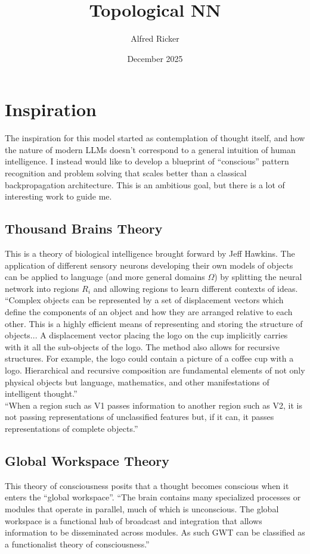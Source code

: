 \documentclass[twocolumn, 10pt]{article}
\title{Topological NN}
\author{Alfred Ricker}
\date{December 2025}
\begin{document}
\setlength{\parindent}{0pt}

\maketitle
\section{Inspiration}
The inspiration for this model started as contemplation of thought itself, and how the nature of modern LLMs doesn't correspond to a general intuition of human intelligence. I instead would like to develop a blueprint of ``conscious'' pattern recognition and problem solving that scales better than a classical backpropagation architecture. This is an ambitious goal, but there is a lot of interesting work to guide me.

\subsection{Thousand Brains Theory}
This is a theory of biological intelligence brought forward by Jeff Hawkins. The application of different sensory neurons developing their own models of objects can be applied to language (and more general domains $\Omega$) by splitting the neural network into regions $R_i$ and allowing regions to learn different contexts of ideas. \\

``Complex objects can be represented by a set of displacement vectors which define the components of an object and how they are arranged relative to each other. This is a highly efficient means of representing and storing the structure of objects... A displacement vector placing the logo on the cup implicitly carries with it all the sub-objects of the logo. The method also allows for recursive structures. For example, the logo could contain a picture of a coffee cup with a logo. Hierarchical and recursive composition are fundamental elements of not only physical objects but language, mathematics, and other manifestations of intelligent thought.'' \\ 

``When a region such as V1 passes information to another region such as V2, it is not passing representations of unclassified features but, if it can, it passes representations of complete objects.''

\subsection{Global Workspace Theory}
This theory of consciousness posits that a thought becomes conscious when it enters the ``global workspace''. ``The brain contains many specialized processes or modules that operate in parallel, much of which is unconscious. The global workspace is a functional hub of broadcast and integration that allows information to be disseminated across modules. As such GWT can be classified as a functionalist theory of consciousness.'' \\
\end{document}

